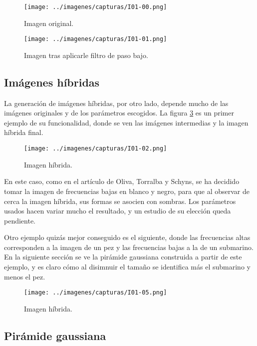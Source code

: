 \documentclass[a4paper, 11pt]{article}
\theoremstyle{definition}
\theoremstyle{theorem}
\begin{document}
  \begin{figure}[ht!]
      \centering
      \texttt{[image: ../imagenes/capturas/I01-00.png]}
      \caption{Imagen original. \label{gauss_original}}
  \end{figure}

  \begin{figure}[ht!]
      \centering
      \texttt{[image: ../imagenes/capturas/I01-01.png]}
      \caption{Imagen tras aplicarle filtro de paso bajo. \label{gauss_resultado}}
  \end{figure}

  \subsection{Imágenes híbridas}
  La generación de imágenes híbridas, por otro lado, depende mucho de las imágenes originales y de los parámetros escogidos. La figura \ref{hibrida_1} es un primer ejemplo de su funcionalidad, donde se ven las imágenes intermedias y la imagen híbrida final.

  \begin{figure}[ht!]
      \centering
      \texttt{[image: ../imagenes/capturas/I01-02.png]}
      \caption{Imagen híbrida. \label{hibrida_1}}
  \end{figure}

  En este caso, como en el artículo de Oliva, Torralba y Schyns, se ha decidido tomar la imagen de frecuencias bajas en blanco y negro, para que al observar de cerca la imagen híbrida, sus formas se asocien con sombras. Los parámetros usados hacen variar mucho el resultado, y un estudio de su elección queda pendiente.

  Otro ejemplo quizás mejor conseguido es el siguiente, donde las frecuencias altas corresponden a la imagen de un pez y las frecuencias bajas a la de un submarino. En la siguiente sección se ve la pirámide gaussiana construida a partir de este ejemplo, y es claro cómo al disimnuir el tamaño se identifica más el submarino y menos el pez.

  \begin{figure}[ht!]
      \centering
      \texttt{[image: ../imagenes/capturas/I01-05.png]}
      \caption{Imagen híbrida. \label{hibrida_2}}
  \end{figure}


  \subsection{Pirámide gaussiana}
\end{document}
